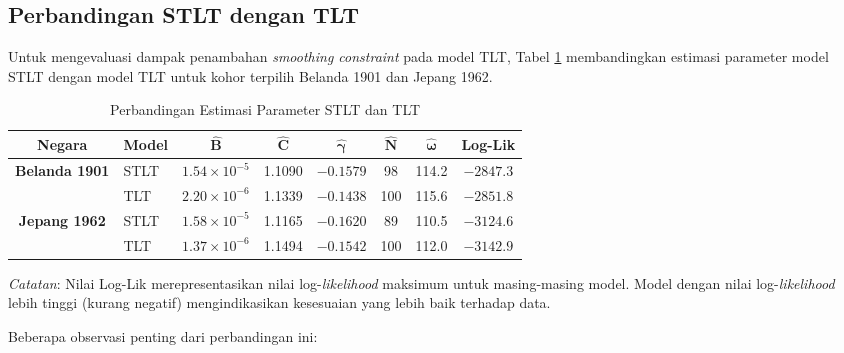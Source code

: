 \subsection{Perbandingan STLT dengan TLT}

Untuk mengevaluasi dampak penambahan \textit{smoothing constraint} pada model TLT, Tabel \ref{tab:stlt_vs_tlt_comparison} membandingkan estimasi parameter model STLT dengan model TLT untuk kohor terpilih Belanda 1901 dan Jepang 1962.

\begin{table}[H]
\centering
\caption{Perbandingan Estimasi Parameter STLT dan TLT}
\label{tab:stlt_vs_tlt_comparison}
\small
\begin{tabular}{clcccccc}
\hline
\textbf{Negara} & \textbf{Model} & $\boldsymbol{\hat{B}}$ & $\boldsymbol{\hat{C}}$ & $\boldsymbol{\hat{\gamma}}$ & $\boldsymbol{\hat{N}}$ & $\boldsymbol{\hat{\omega}}$ & \textbf{Log-Lik} \\
\hline
\multirow{2}{*}{\textbf{Belanda 1901}} 
& STLT & $1.54 \times 10^{-5}$ & 1.1090 & $-0.1579$ & 98 & 114.2 & $-2847.3$ \\
& TLT & $2.20 \times 10^{-6}$ & 1.1339 & $-0.1438$ & 100 & 115.6 & $-2851.8$ \\
\hline
\multirow{2}{*}{\textbf{Jepang 1962}} 
& STLT & $1.58 \times 10^{-5}$ & 1.1165 & $-0.1620$ & 89 & 110.5 & $-3124.6$ \\
& TLT & $1.37 \times 10^{-6}$ & 1.1494 & $-0.1542$ & 100 & 112.0 & $-3142.9$ \\
\hline
\end{tabular}
\begin{tablenotes}
\small
\item \textit{Catatan}: Nilai Log-Lik merepresentasikan nilai log-\textit{likelihood} maksimum untuk masing-masing model. Model dengan nilai log-\textit{likelihood} lebih tinggi (kurang negatif) mengindikasikan kesesuaian yang lebih baik terhadap data.
\end{tablenotes}
\end{table}

Beberapa observasi penting dari perbandingan ini:

